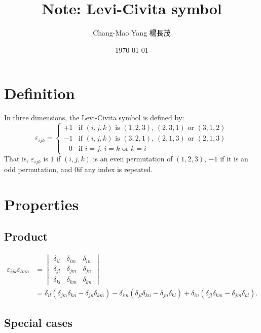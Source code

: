 \documentclass[12pt]{article}
\title{Note: Levi-Civita symbol}
\date{\today}
\author{Chang-Mao Yang 楊長茂}
\begin{document}
\maketitle
\tableofcontents
\section{Definition}
In three dimensions, the Levi-Civita symbol is defined by:
\begin{equation}
\varepsilon _{ijk} =
\begin{cases}
+1	&	\text{if $(i,j,k)$ is $(1,2,3)$, $(2,3,1)$ or $(3,1,2)$}\\
-1	&	\text{if $(i,j,k)$ is $(3,2,1)$, $(2,1,3)$ or $(2,1,3)$}\\
\;\;\,0&\text{if $i=j$, $i=k$ or $k=i$}
\end{cases}
\end{equation}
That is, $\varepsilon_{ijk}$ is $1$ if $(i,j,k)$ is an even permutation of $(1,2,3)$, $−1$ if it is an odd permutation, and $0$​ if any index is repeated.

\section{Properties}

\subsection{Product}


\begin{equation}
\begin{aligned}
\varepsilon _{ijk}\varepsilon _{lmn}
&=\begin{vmatrix}
\delta _{il}&\delta _{im}&\delta _{in}\\
\delta _{jl}&\delta _{jm}&\delta _{jn}\\
\delta _{kl}&\delta _{km}&\delta _{kn}
\end{vmatrix}\\[6pt]
&=\delta _{il} \left(\delta _{jm}\delta _{kn}-\delta _{jn}\delta _{km}\right)
-\delta _{im} \left(\delta _{jl}\delta _{kn}-\delta _{jn}\delta _{kl}\right)
+\delta _{in} \left(\delta _{jl}\delta _{km}-\delta _{jm}\delta _{kl}\right).
\end{aligned}
\end{equation}

\subsection{Special cases} %
\end{document}
